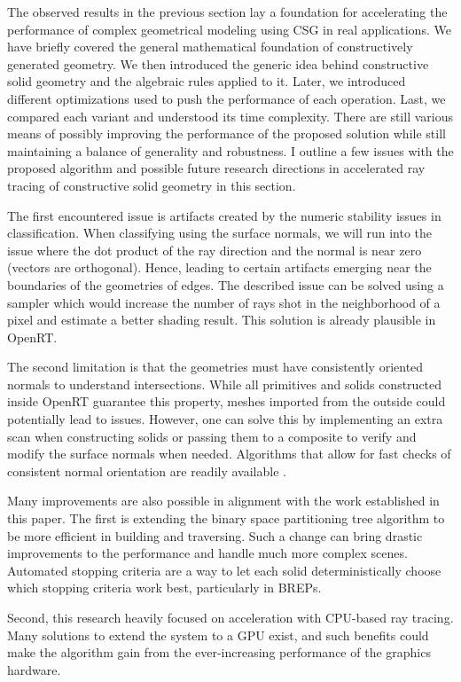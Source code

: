 \documentclass[a4paper,11pt,oneside]{article}
\begin{document}
The observed results in the previous section lay a foundation for accelerating the performance of complex geometrical modeling using CSG in real applications. We have briefly covered the general mathematical foundation of constructively generated geometry. We then introduced the generic idea behind constructive solid geometry and the algebraic rules applied to it. Later, we introduced different optimizations used to push the performance of each operation. Last, we compared each variant and understood its time complexity. There are still various means of possibly improving the performance of the proposed solution while still maintaining a balance of generality and robustness. I outline a few issues with the proposed algorithm and possible future research directions in accelerated ray tracing of constructive solid geometry in this section.

The first encountered issue is artifacts created by the numeric stability issues in classification. When classifying using the surface normals, we will run into the issue where the dot product of the ray direction and the normal is near zero (vectors are orthogonal). Hence, leading to certain artifacts emerging near the boundaries of the geometries of edges. The described issue can be solved using a sampler which would increase the number of rays shot in the neighborhood of a pixel and estimate a better shading result. This solution is already plausible in OpenRT.

The second limitation is that the geometries must have consistently oriented normals to understand intersections. While all primitives and solids constructed inside OpenRT guarantee this property, meshes imported from the outside could potentially lead to issues. However, one can solve this by implementing an extra scan when constructing solids or passing them to a composite to verify and modify the surface normals when needed. Algorithms that allow for fast checks of consistent normal orientation are readily available \cite{normal_orientation}.

Many improvements are also possible in alignment with the work established in this paper. The first is extending the binary space partitioning tree algorithm to be more efficient in building and traversing. Such a change can bring drastic improvements to the performance and handle much more complex scenes. Automated stopping criteria are a way to let each solid deterministically choose which stopping criteria work best, particularly in BREPs.

Second, this research heavily focused on acceleration with CPU-based ray tracing. Many solutions to extend the system to a GPU exist, and such benefits could make the algorithm gain from the ever-increasing performance of the graphics hardware.
\end{document}

